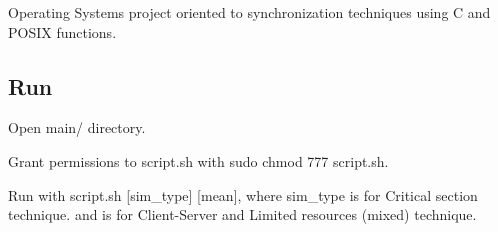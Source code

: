 Operating System\textquotesingle{}s project oriented to synchronization techniques using C and P\+O\+S\+IX functions.

\subsection*{Run}


\begin{DoxyEnumerate}
\item Open {\ttfamily main/} directory.
\item Grant permissions to script.\+sh with {\ttfamily sudo chmod 777 script.\+sh}.
\item Run with {\ttfamily script.\+sh \mbox{[}sim\+\_\+type\mbox{]} \mbox{[}mean\mbox{]}}, where {\ttfamily sim\+\_\+type} is {} for Critical section technique. and {} is for Client-\/\+Server and Limited resources (mixed) technique. 
\end{DoxyEnumerate}